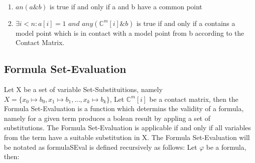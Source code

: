 \documentclass{article}
\begin{document}
	\begin{enumerate}
		\item $an(a \& b)$ is true if and only if a and b have a common point
		\item $\exists i < n : a[i]=1 \textit{ and } any(\mathbb{C}^m[i] \& b)$ is true if and only if a contains a model point which is 
			in contact with a model point from b according to the Contact Matrix.
	\end{enumerate}
			

	\subsection*{Formula Set-Evaluation}
		Let X be a set of variable Set-Substituitions, namely $ X = \{ x_0 \longmapsto b_0, x_1 \longmapsto b_1, ..., x_k \longmapsto b_k \}$, 
		Let $\mathbb{C}^m[i]$ be a contact matrix,
		then the Formula Set-Evaluation is a function which determins the validity of a formula, namely for a given term 
		produces a bolean result by appling a set of substitutions.
		The Formula Set-Evaluation is applicable if and only if all variables from the term have a suitable substitution in X.
		\newline
		\newline
		The Formula Set-Evaluation will be notated as formulaSEval is defined recursively as follows:
		\newline
		Let $\varphi$ be a formula, then:
\end{document}
